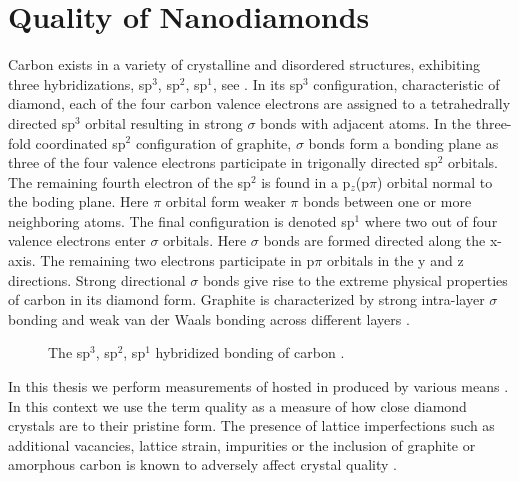 
\chapter{Quality of Nanodiamonds}	\label{ch::crystal_quality}

		Carbon exists in a variety of crystalline and disordered structures, exhibiting three hybridizations, sp$^3$, sp$^2$, sp$^1$, see  . In its sp$^3$ configuration, characteristic of diamond, each of the four carbon valence electrons are assigned to a tetrahedrally directed sp$^3$ orbital resulting in strong $\sigma$ bonds with adjacent atoms.
		In the three-fold coordinated sp$^2$ configuration of graphite, $\sigma$ bonds form a bonding plane as three of the four valence electrons participate in trigonally directed sp$^2$ orbitals. The remaining fourth electron of the sp$^2$ is found in a p$_z$(p$\pi$) orbital normal to the boding plane. Here $\pi$ orbital form weaker $\pi$ bonds between one or more neighboring atoms.
		The final configuration is denoted sp$^1$ where two out of four valence electrons enter $\sigma$ orbitals. Here $\sigma$ bonds are formed directed along the x-axis. The remaining two electrons participate in p$\pi$ orbitals in the y and z directions.
		Strong directional $\sigma$ bonds give rise to the extreme physical properties of carbon in its diamond form. Graphite is characterized by strong intra-layer $\sigma$ bonding and weak van der Waals bonding across different layers \cite{Robertson2002}.

		\begin{figure}[!htb]
			\centering
			\caption[Carbon hybridizations]{The sp$^3$, sp$^2$, sp$^1$ hybridized bonding of carbon \cite{Robertson1986}.}
			\label{fig::c_bonds}
		\end{figure}

		In this thesis we perform measurements of \sivs hosted in \nds produced by various means .
		In this context we use the term quality as a measure of how close diamond crystals are to their pristine form.
		The presence of lattice imperfections such as additional vacancies, lattice strain, impurities or the inclusion of graphite or amorphous carbon is known to adversely affect crystal quality \cite{Zaitsev2001,Prawer2004,Orwa2000}.

